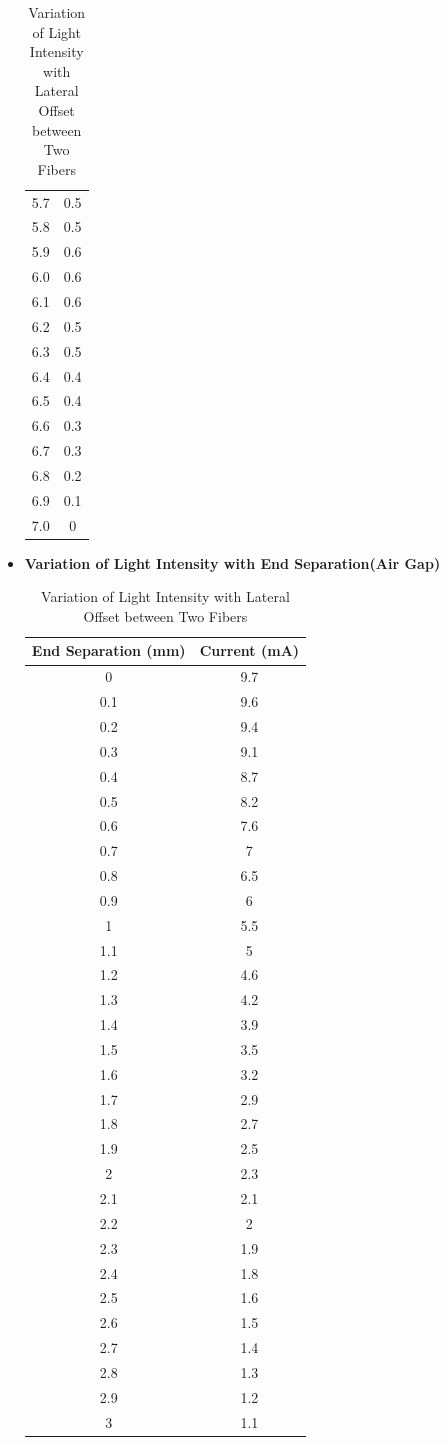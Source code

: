 \begin{itemize}
\begin{table}[H]
\begin{tabular}{|c|c|}
        5.7 & 0.5 \\
        5.8 & 0.5 \\
        5.9 & 0.6 \\
        6.0 & 0.6 \\
        6.1 & 0.6 \\
        6.2 & 0.5 \\
        6.3 & 0.5 \\
        6.4 & 0.4 \\
        6.5 & 0.4 \\
        6.6 & 0.3 \\
        6.7 & 0.3 \\
        6.8 & 0.2 \\
        6.9 & 0.1 \\
        7.0 & 0 \\
        \hline
    \end{tabular}
    \caption{Variation of Light Intensity with Lateral Offset between Two Fibers}
\end{table}
\pagebreak
\item \textbf{Variation of Light Intensity with End Separation(Air Gap)}
\begin{table}[H]
    \centering
    \begin{tabular}{|c|c|}
        \hline
        \textbf{End Separation (mm)} & \textbf{Current (mA)} \\
        \hline
       0 &	9.7\\
0.1	& 9.6\\
0.2	& 9.4\\
0.3	& 9.1\\
0.4	& 8.7\\
0.5	& 8.2\\
0.6	& 7.6 \\
0.7	&7\\
0.8	&6.5\\
0.9	&6\\
1	&5.5\\
1.1	&5\\
1.2	&4.6\\
1.3	&4.2\\
1.4	&3.9\\
1.5	&3.5\\
1.6	&3.2\\
1.7	&2.9\\
1.8	&2.7\\
1.9	&2.5\\
2	&2.3\\
2.1	&2.1\\
2.2	&2\\
2.3	&1.9\\
2.4	&1.8\\
2.5	&1.6\\
2.6	&1.5\\
2.7	&1.4\\
2.8	&1.3\\
2.9&	1.2\\
3&1.1\\
        \hline
    \end{tabular}
    \caption{Variation of Light Intensity with Lateral Offset between Two Fibers}
\end{table}
\end{itemize}

